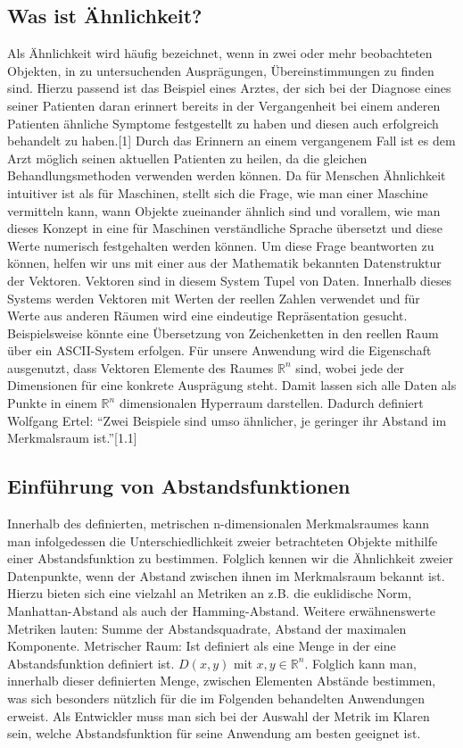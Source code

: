 \documentclass[fontsize=11pt]{scrartcl}
\begin{document}
            \subsection{Was ist Ähnlichkeit?}
                Als Ähnlichkeit wird häufig bezeichnet, wenn in zwei oder mehr beobachteten Objekten, in zu untersuchenden Ausprägungen, Übereinstimmungen zu finden sind. 
                Hierzu passend ist das Beispiel eines Arztes, der sich bei der Diagnose eines seiner Patienten daran erinnert bereits in der Vergangenheit bei einem anderen Patienten ähnliche Symptome festgestellt zu haben und diesen auch erfolgreich behandelt zu haben.[1] Durch das Erinnern an einem vergangenem Fall ist es dem Arzt möglich seinen aktuellen Patienten zu heilen, da die gleichen Behandlungsmethoden verwenden werden können.
                Da für Menschen Ähnlichkeit intuitiver ist als für Maschinen, stellt sich die Frage, wie man einer Maschine vermitteln kann, wann Objekte zueinander ähnlich sind und vorallem, wie man dieses Konzept in eine für Maschinen verständliche Sprache übersetzt und diese Werte numerisch festgehalten werden können.
                Um diese Frage beantworten zu können, helfen wir uns mit einer aus der Mathematik bekannten Datenstruktur der Vektoren.
                Vektoren sind in diesem System Tupel von Daten. Innerhalb dieses Systems werden Vektoren mit Werten der reellen Zahlen verwendet und für Werte aus anderen Räumen wird eine eindeutige Repräsentation gesucht. Beispielsweise könnte eine Übersetzung von Zeichenketten in den reellen Raum über ein ASCII-System erfolgen. 
                Für unsere Anwendung wird die Eigenschaft ausgenutzt, dass Vektoren Elemente des Raumes $\mathbb{R}^n$ sind, wobei jede der Dimensionen für eine konkrete Ausprägung steht. Damit lassen sich alle Daten als Punkte in einem $\mathbb{R}^n$ dimensionalen Hyperraum darstellen. Dadurch definiert Wolfgang Ertel: “Zwei Beispiele sind umso ähnlicher, je geringer ihr Abstand im Merkmalsraum ist.”[1.1] 
            \subsection{Einführung von Abstandsfunktionen}
                Innerhalb des definierten, metrischen n-dimensionalen Merkmalsraumes kann man infolgedessen die Unterschiedlichkeit zweier betrachteten Objekte mithilfe einer Abstandsfunktion zu bestimmen. Folglich kennen wir die Ähnlichkeit zweier Datenpunkte, wenn der Abstand zwischen ihnen im Merkmalsraum bekannt ist. Hierzu bieten sich eine vielzahl an Metriken an z.B. die euklidische Norm, Manhattan-Abstand als auch der Hamming-Abstand. Weitere erwähnenswerte Metriken lauten: Summe der Abstandsquadrate, Abstand der maximalen Komponente. 
                Metrischer Raum: Ist definiert als eine Menge in der eine Abstandsfunktion definiert ist.
                $D(x,y)$ mit $x,y \in \mathbb{R}^n$.
                Folglich kann man, innerhalb dieser definierten Menge, zwischen Elementen Abstände bestimmen, was sich besonders nützlich für die im Folgenden behandelten Anwendungen erweist.
                Als Entwickler muss man sich bei der Auswahl der Metrik im Klaren sein, welche Abstandsfunktion für seine Anwendung am besten geeignet ist. 
\end{document}
